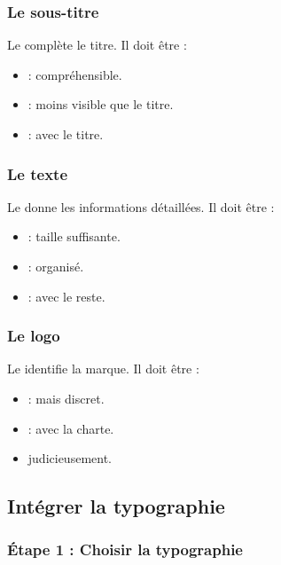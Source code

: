 \subsubsection{Le sous-titre}

Le  complète le titre. Il doit être :

\begin{itemize}
    \item {} : compréhensible.
    \item {} : moins visible que le titre.
    \item {} : avec le titre.
\end{itemize}

\subsubsection{Le texte}

Le  donne les informations détaillées. Il doit être :

\begin{itemize}
    \item {} : taille suffisante.
    \item {} : organisé.
    \item {} : avec le reste.
\end{itemize}

\subsubsection{Le logo}

Le  identifie la marque. Il doit être :

\begin{itemize}
    \item {} : mais discret.
    \item {} : avec la charte.
    \item {} judicieusement.
\end{itemize}

\subsection{Intégrer la typographie}

\subsubsection{Étape 1 : Choisir la typographie}

